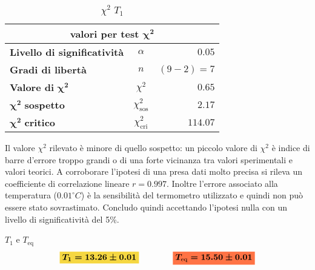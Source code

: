 \documentclass{article}
\newcommand{\giallo}[1]{\colorbox{myyellow}{$\displaystyle #1$}}
\newcommand{\rosso}[1]{\colorbox{myred}{$\displaystyle #1$}}
\begin{document}
	
	\begin{table}[H] \centering
		\begin{small}
			\begin{tabular}{@{}lcr@{}}\toprule
				\multicolumn{3}{c}{\textbf{valori per test} \(\boldsymbol{\chi^2}\)}\\ \midrule
				\textbf{Livello di significatività}		 &  \(\alpha\) &\(0.05\)\footnotemark \\  \hdashline
				\textbf{Gradi di libertà}		 & \(n\)  &\((9-2) = 7\) \\   \hdashline
				\textbf{Valore di} \(\boldsymbol{\chi^2}\)	 & \(\chi^2\)  &\(0.65\)\\  \hdashline
				\(\boldsymbol{\chi^2}\) \textbf{sospetto}		& \(\chi^2_{\text{sos}}\)  &\(2.17\)\\ \hdashline
				\(\boldsymbol{\chi^2}\) \textbf{critico}		& \(\chi^2_{\text{cri}}\)  &\(114.07\)\\ 
				\bottomrule
			\end{tabular}
		\end{small}
		\caption{\(\chi^2\) \(T_{1}\)}
	\end{table}
	
	\noindent
	Il valore \(\chi^2\) rilevato è minore di quello sospetto: un piccolo valore di \(\chi^2\) è indice di barre d'errore troppo grandi o di una forte vicinanza tra valori sperimentali e valori teorici. A corroborare l'ipotesi di una presa dati molto precisa si rileva un coefficiente di correlazione lineare \(r = 0.997\). Inoltre l'errore associato alla temperatura (\(0.01 ^\circ C\)) è la sensibilità del termometro utilizzato e quindi non può essere stato sovrastimato. Concludo quindi accettando l'ipotesi nulla con un livello di significatività del 5\%.
	
	\begin{es}{\(T_{1}\) e \(T_{\text{eq}}\)}
		\[ 
		\giallo{\boldsymbol{T_{1} = 13.26	\pm 0.01}}\qquad \qquad \rosso{\boldsymbol{T_{\text{eq}} = 15.50	\pm 0.01}}
		\]
	\end{es}
	
\end{document}
